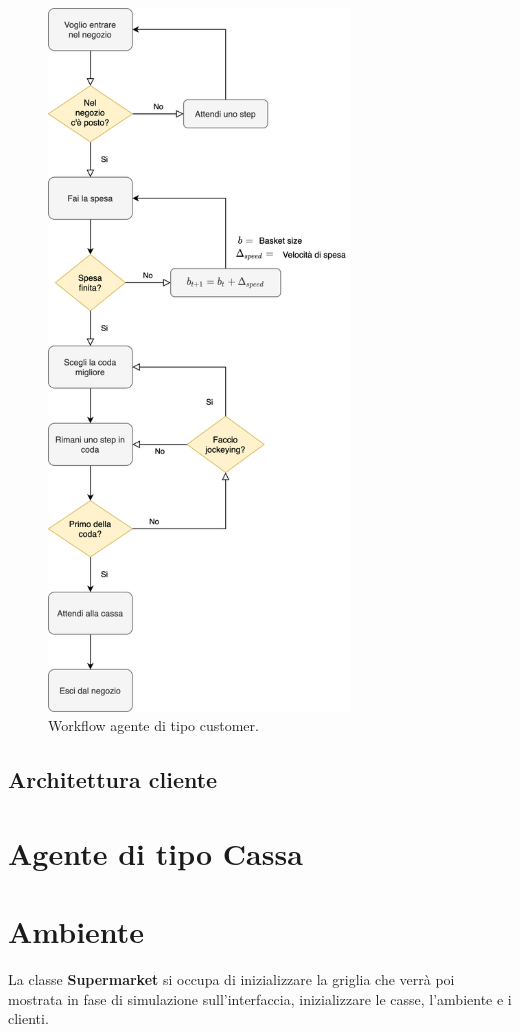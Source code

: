 \begin{figure}[htp!]
	\centering
	\hspace*{3cm}
	\includegraphics[width=8cm]{"images/workflow_customer.png"}
	\caption{Workflow agente di tipo customer.}
	\label{fig:workflow_customer}
\end{figure}


\subsection{Architettura cliente}


\section{Agente di tipo Cassa}


\section{Ambiente}
La classe \textbf{Supermarket} si occupa di inizializzare la griglia che verrà poi mostrata in fase di simulazione sull'interfaccia, inizializzare le casse, l'ambiente e i clienti.

